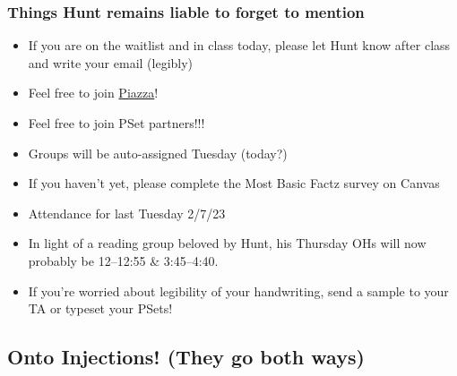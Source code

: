 \begin{frame}
\frametitle{Things Hunt remains liable to forget to mention}

\begin{itemize}[<+->]


\item If you are on the waitlist and in class today, please let Hunt know after class and write your email (legibly) 

\item Feel free to join \href{https://piazza.com/mit/spring2023/24118}{Piazza}! 

\item Feel free to join PSet partners!!! 
\item[] Groups will be auto-assigned Tuesday (today?)

\item If you haven't yet, please complete the Most Basic Factz survey on Canvas
\item[] Attendance for last Tuesday 2/7/23

\item In light of a reading group beloved by Hunt, his Thursday OHs will now probably be 12--12:55 \& 3:45--4:40. 

\item If you're worried about legibility of your handwriting, send a sample to your TA or typeset your PSets! 



\end{itemize}
\end{frame}





\subsection{Onto Injections! (They go both ways)}

